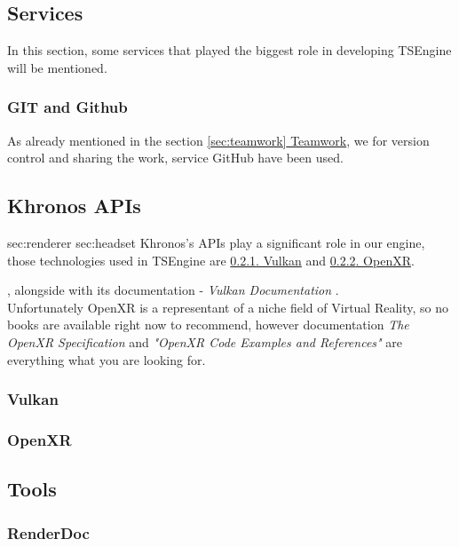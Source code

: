 \subsection{Services}
In this section, some services that played the biggest role in developing TSEngine will be mentioned.
\subsubsection{GIT and Github}
As already mentioned in the section \hyperref[sec:teamwork]{\ref*{sec:teamwork} Teamwork}, we for version control and sharing the work, service GitHub have been used. 

\subsection{Khronos APIs}
\label{sec:khronos}
sec:renderer sec:headset
Khronos's APIs play a significant role in our engine, those technologies used in TSEngine are \hyperref[sec:stack_vk]{\ref*{sec:stack_vk}. Vulkan} and \hyperref[sec:stack_xr]{\ref*{sec:stack_xr}. OpenXR}. 


\cite{VulkanCookbook}, alongside with its documentation - \textit{Vulkan Documentation} \cite{VkDoc}.\\ Unfortunately OpenXR is a representant of a niche field of Virtual Reality, so no books are available right now to recommend, however documentation \textit{The OpenXR Specification} \cite{XrDoc} and \textit{"OpenXR Code Examples and References"} \cite{OpenXrExamples} are everything what you are looking for. %


\subsubsection{Vulkan}
\label{sec:stack_vk}
\subsubsection{OpenXR}
\label{sec:stack_xr}
\subsection{Tools}
\subsubsection{RenderDoc}
\label{sec:renderdoc}